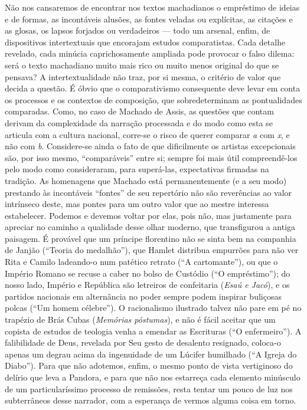 Não nos cansaremos de encontrar nos textos machadianos o empréstimo de
ideias e de formas, as incontáveis alusões, as fontes veladas ou
explícitas, as citações e as glosas, os lapsos forjados ou verdadeiros
--- todo um arsenal, enfim, de dispositivos intertextuais que encorajam
estudos comparatistas. Cada detalhe revelado, cada minúcia
caprichosamente ampliada pode provocar o falso dilema: será o texto
machadiano muito mais rico ou muito menos original do que se pensava? A
intertextualidade não traz, por si mesma, o critério de valor que decida
a questão. É óbvio que o comparativismo consequente deve levar em conta
os processos e os contextos de composição, que sobredeterminam as
pontualidades comparadas. Como, no caso de Machado de Assis, as questões
que contam derivam da complexidade da narração processada e do modo como
esta se articula com a cultura nacional, corre-se o risco de querer
comparar \emph{a} com \emph{x}, e não com \emph{b}. Considere-se ainda o
fato de que dificilmente os artistas excepcionais são, por isso mesmo,
``comparáveis'' entre si; sempre foi mais útil compreendê-los pelo modo
como consideraram, para superá-las, expectativas firmadas na tradição.
As homenagens que Machado está permanentemente (e a seu modo) prestando
às incontáveis ``fontes'' de seu repertório não são reverências ao valor
intrínseco deste, mas pontes para um outro valor que ao mestre interessa
estabelecer. Podemos e devemos voltar por elas, pois não, mas justamente
para apreciar no caminho a qualidade desse olhar moderno, que
transfigurou a antiga paisagem. É provável que um príncipe florentino
não se sinta bem na companhia de Janjão (``Teoria do medalhão''), que
Hamlet distribua empurrões para não ver Rita e Camilo ladeando-o num
patético retrato (``A cartomante''), ou que o Império Romano se recuse a
caber no bolso de Custódio (``O empréstimo''); do nosso lado, Império e
República são letreiros de confeitaria (\emph{Esaú e Jacó}), e os
partidos nacionais em alternância no poder sempre podem inspirar
buliçosas polcas (``Um homem célebre''). O racionalismo ilustrado talvez
não pare em pé no trapézio de Brás Cubas (\emph{Memórias póstumas}), e
não é fácil aceitar que um copista de estudos de teologia venha a
emendar as Escrituras (``O enfermeiro''). A falibilidade de Deus,
revelada por Seu gesto de desalento resignado, coloca-o apenas um degrau
acima da ingenuidade de um Lúcifer humilhado (``A Igreja do Diabo'').
Para que não adotemos, enfim, o mesmo ponto de vista vertiginoso do
delírio que leva a Pandora, e para que não nos estarreça cada elemento
minúsculo de um particularíssimo processo de remissões, resta tentar um
pouco de luz nos subterrâneos desse narrador, com a esperança de vermos
alguma coisa em torno.

